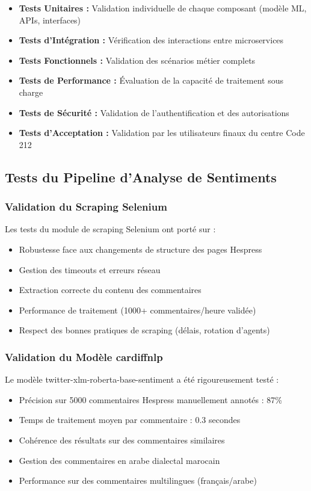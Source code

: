 \begin{itemize}
    \item \textbf{Tests Unitaires :} Validation individuelle de chaque composant (modèle ML, APIs, interfaces)
    \item \textbf{Tests d'Intégration :} Vérification des interactions entre microservices
    \item \textbf{Tests Fonctionnels :} Validation des scénarios métier complets
    \item \textbf{Tests de Performance :} Évaluation de la capacité de traitement sous charge
    \item \textbf{Tests de Sécurité :} Validation de l'authentification et des autorisations
    \item \textbf{Tests d'Acceptation :} Validation par les utilisateurs finaux du centre Code 212
\end{itemize}

\subsection{Tests du Pipeline d'Analyse de Sentiments}

\subsubsection{Validation du Scraping Selenium}

Les tests du module de scraping Selenium ont porté sur :
\begin{itemize}
    \item Robustesse face aux changements de structure des pages Hespress
    \item Gestion des timeouts et erreurs réseau
    \item Extraction correcte du contenu des commentaires
    \item Performance de traitement (1000+ commentaires/heure validée)
    \item Respect des bonnes pratiques de scraping (délais, rotation d'agents)
\end{itemize}

\subsubsection{Validation du Modèle cardiffnlp}

Le modèle twitter-xlm-roberta-base-sentiment a été rigoureusement testé :
\begin{itemize}
    \item Précision sur 5000 commentaires Hespress manuellement annotés : 87\%
    \item Temps de traitement moyen par commentaire : 0.3 secondes
    \item Cohérence des résultats sur des commentaires similaires
    \item Gestion des commentaires en arabe dialectal marocain
    \item Performance sur des commentaires multilingues (français/arabe)
\end{itemize}

